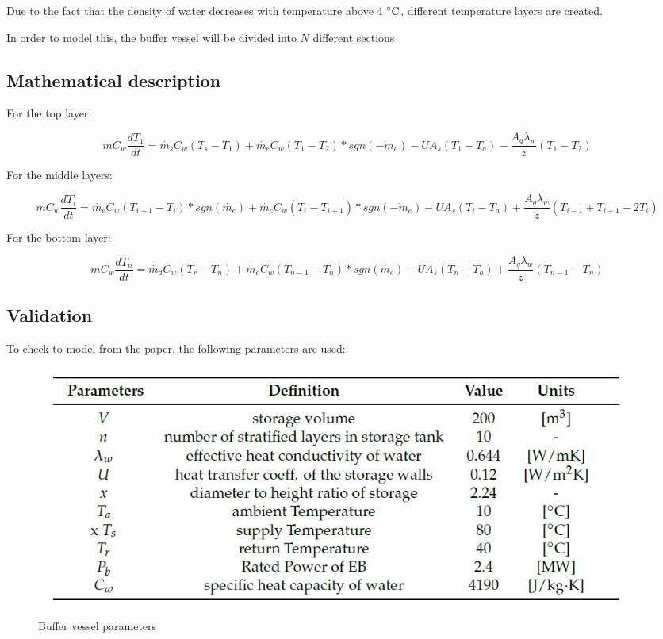 Due to the fact that the density of water decreases with temperature above 4 $^\circ\mathrm{C}$, different temperature layers are created.

In order to model this, the buffer vessel will be divided into $N$ different sections 


\subsection{Mathematical description}

For the top layer:

\begin{equation}
	\label{eq:Buffer vessel top layer}
	mC_w \dfrac{dT_1}{dt} = \dot{m_s}C_w(T_s - T_1) + \dot{m_e}C_w(T_1 - T_2)*sgn(\dot{-m_e}) - UA_s(T_1 - T_a) - \frac{A_q\lambda_w}{z}(T_1-T_2)
\end{equation}

For the middle layers:

\begin{equation}
	\label{eq:Buffer vessel middle layers}
	mC_w \dfrac{dT_i}{dt} = \dot{m_e}C_w(T_{i-1} - T_{i})*sgn(\dot{m_e}) + \dot{m_e}C_w(T_{i} - T_{i+1})*sgn(\dot{-m_e}) - UA_s(T_i - T_a) + \frac{A_q\lambda_w}{z}(T_{i-1} + T_{i+1} - 2T_i)
\end{equation}

For the bottom layer:

\begin{equation}
	\label{eq:Buffer vessel bottom layer}
	mC_w \dfrac{dT_n}{dt} = \dot{m_d}C_w(T_r - T_n) + \dot{m_e}C_w(T_{n-1} - T_n)*sgn(\dot{m_e}) - UA_s(T_n + T_a) + \frac{A_q\lambda_w}{z}(T_{n-1}-T_n)
\end{equation}

\newpage

\subsection{Validation}

To check to model from the paper, the following parameters are used:

\begin{figure}[h]
	\centering
	\includegraphics[width=0.7\columnwidth]{Figures/parameters_paper.JPG}
	\caption[Short title]{Buffer vessel parameters}
\end{figure}

